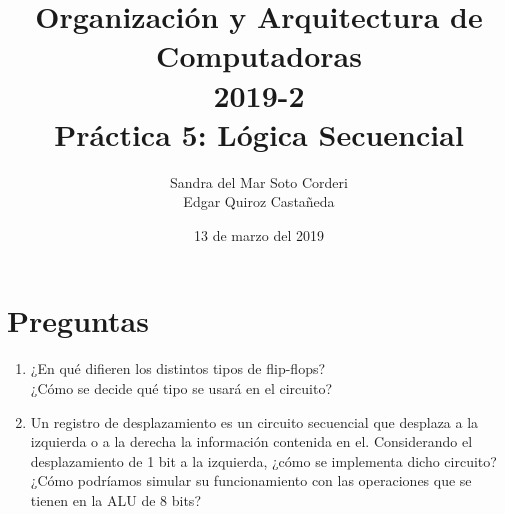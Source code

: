 \documentclass{article}
\begin{document}
    \title{
        Organización y Arquitectura de Computadoras \\
        2019-2 \\
        Práctica 5: Lógica Secuencial
    }
    \author{
        Sandra del Mar Soto Corderi \\
        Edgar Quiroz Castañeda
    }
    \date{
        13 de marzo del 2019
    }

    \maketitle

    \section{Preguntas}

    \begin{enumerate}
        \item 
            ¿En qué difieren los distintos tipos de flip-flops?\\
            
            
            ¿Cómo se decide qué tipo se usará en el circuito?\\
            

		\item
        Un registro de desplazamiento es un circuito secuencial que desplaza a la izquierda o a la derecha la información contenida en el. Considerando el desplazamiento de 1 bit a la izquierda, ¿cómo se implementa dicho circuito?\\
        
        ¿Cómo podríamos simular su funcionamiento con las operaciones que se tienen en la ALU de 8 bits? \\
      
                 
    \end{enumerate}
  
    
    
\end{document}
